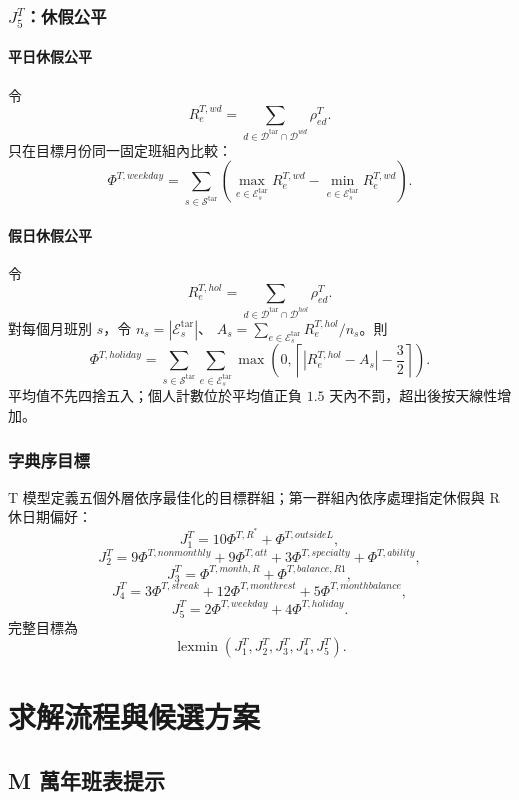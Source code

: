 \documentclass[a4paper,12pt]{article}
\begin{document}
\subsubsection{\texorpdfstring{$J^T_5$}{J5}：休假公平}

\paragraph{平日休假公平}
令
\[
  R^{T,wd}_{e}
  =
  \sum_{d\in\mathcal{D}^{\mathrm{tar}}\cap\mathcal{D}^{wd}}
  \rho^{T}_{ed}.
\]
只在目標月份同一固定班組內比較：
\[
  \Phi^{T,weekday}
  =
  \sum_{s\in\mathcal{S}^{\mathrm{tar}}}
  \left(
    \max_{e\in\mathcal{E}^{\mathrm{tar}}_s}R^{T,wd}_{e}
    -
    \min_{e\in\mathcal{E}^{\mathrm{tar}}_s}R^{T,wd}_{e}
  \right).
\]

\paragraph{假日休假公平}
令
\[
  R^{T,hol}_{e}
  =
  \sum_{d\in\mathcal{D}^{\mathrm{tar}}\cap\mathcal{D}^{hol}}
  \rho^{T}_{ed}.
\]
對每個月班別 $s$，令 $n_s=|\mathcal E^{\mathrm{tar}}_s|$、
$A_s=\sum_{e\in\mathcal E^{\mathrm{tar}}_s}R^{T,hol}_e/n_s$。則
\[
  \Phi^{T,holiday}
  =
  \sum_{s\in\mathcal{S}^{\mathrm{tar}}}
  \sum_{e\in\mathcal E^{\mathrm{tar}}_s}
  \max\left(0,
    \left\lceil |R^{T,hol}_e-A_s|-\frac{3}{2}\right\rceil
  \right).
\]
平均值不先四捨五入；個人計數位於平均值正負 $1.5$ 天內不罰，超出後按天線性增加。

\subsubsection{字典序目標}

T 模型定義五個外層依序最佳化的目標群組；第一群組內依序處理指定休假與 R休日期偏好：
\[
  J^T_1=10\Phi^{T,R^*}+\Phi^{T,outsideL},
\]
\[
  J^T_2
  =
  9\Phi^{T,nonmonthly}
  +9\Phi^{T,att}
  +3\Phi^{T,specialty}
  +\Phi^{T,ability},
\]
\[
  J^T_3
  =
  \Phi^{T,month,R}
  +\Phi^{T,balance,R1},
\]
\[
  J^T_4
  =
  3\Phi^{T,streak}
  +12\Phi^{T,monthrest}
  +5\Phi^{T,monthbalance},
\]
\[
  J^T_5
  =
  2\Phi^{T,weekday}
  +4\Phi^{T,holiday}.
\]
完整目標為
\[
  \operatorname{lexmin}
  \left(J^T_1,J^T_2,J^T_3,J^T_4,J^T_5\right).
\]

\section{求解流程與候選方案}

\subsection{M 萬年班表提示}
\end{document}
